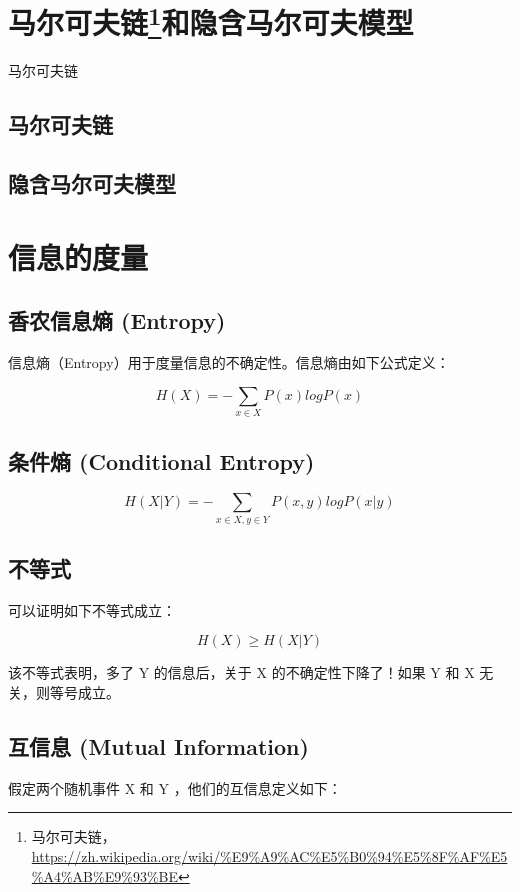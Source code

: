 \documentclass[11pt]{article}
\begin{document}
\section{马尔可夫链\footnote{马尔可夫链，\url{https://zh.wikipedia.org/wiki/\%E9\%A9\%AC\%E5\%B0\%94\%E5\%8F\%AF\%E5\%A4\%AB\%E9\%93\%BE}}和隐含马尔可夫模型}
\label{sec:org48dd0b1}
马尔可夫链

\subsection{马尔可夫链}
\label{sec:org063e95e}

\subsection{隐含马尔可夫模型}
\label{sec:org0697504}


\section{信息的度量}
\label{sec:org307649d}
\subsection{香农信息熵 (Entropy)}
\label{sec:org42bc255}
信息熵（Entropy）用于度量信息的不确定性。信息熵由如下公式定义：

\begin{equation}
H(X)=-\sum\limits_{x\in X}P(x)logP(x)
\end{equation}

\subsection{条件熵 (Conditional Entropy)}
\label{sec:org6cad02a}

\begin{equation}
H(X|Y) = -\sum\limits_{x\in X,y\in Y}P(x,y)logP(x|y)
\end{equation}

\subsection{不等式}
\label{sec:org6f77f94}
可以证明如下不等式成立：

$$H(X) \ge H(X|Y)$$

该不等式表明，多了 Y 的信息后，关于 X 的不确定性下降了！如果 Y 和 X 无关，则等号成立。

\subsection{互信息 (Mutual Information)}
\label{sec:org94d91b4}
假定两个随机事件 X 和 Y ，他们的互信息定义如下：
\end{document}
